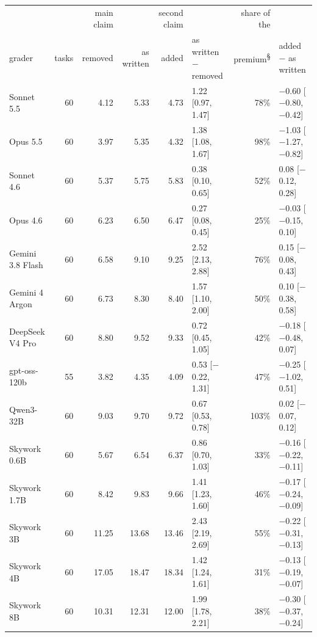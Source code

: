 {\scriptsize\setlength{\tabcolsep}{4pt}
\begin{tabular}{@{}lrrrr@{\hspace{8pt}}lr@{\hspace{8pt}}l@{}}
\toprule
 &  & main claim &  & second claim &  & share of the &  \\
grader & tasks & removed & as written & added & as written $-$ removed & premium\textsuperscript{\S} & added $-$ as written \\
\midrule
Sonnet 5.5 & 60 & 4.12 & 5.33 & 4.73 & 1.22 [0.97, 1.47] & 78\% & $-$0.60 [$-$0.80, $-$0.42] \\
Opus 5.5 & 60 & 3.97 & 5.35 & 4.32 & 1.38 [1.08, 1.67] & 98\% & $-$1.03 [$-$1.27, $-$0.82] \\
Sonnet 4.6 & 60 & 5.37 & 5.75 & 5.83 & 0.38 [0.10, 0.65] & 52\% & 0.08 [$-$0.12, 0.28] \\
Opus 4.6 & 60 & 6.23 & 6.50 & 6.47 & 0.27 [0.08, 0.45] & 25\% & $-$0.03 [$-$0.15, 0.10] \\
Gemini 3.8 Flash & 60 & 6.58 & 9.10 & 9.25 & 2.52 [2.13, 2.88] & 76\% & 0.15 [$-$0.08, 0.43] \\
Gemini 4 Argon & 60 & 6.73 & 8.30 & 8.40 & 1.57 [1.10, 2.00] & 50\% & 0.10 [$-$0.38, 0.58] \\
DeepSeek V4 Pro & 60 & 8.80 & 9.52 & 9.33 & 0.72 [0.45, 1.05] & 42\% & $-$0.18 [$-$0.48, 0.07] \\
gpt-oss-120b & 55 & 3.82 & 4.35 & 4.09 & 0.53 [$-$0.22, 1.31] & 47\% & $-$0.25 [$-$1.02, 0.51] \\
Qwen3-32B & 60 & 9.03 & 9.70 & 9.72 & 0.67 [0.53, 0.78] & 103\% & 0.02 [$-$0.07, 0.12] \\
\midrule
Skywork 0.6B & 60 & 5.67 & 6.54 & 6.37 & 0.86 [0.70, 1.03] & 33\% & $-$0.16 [$-$0.22, $-$0.11] \\
Skywork 1.7B & 60 & 8.42 & 9.83 & 9.66 & 1.41 [1.23, 1.60] & 46\% & $-$0.17 [$-$0.24, $-$0.09] \\
Skywork 3B & 60 & 11.25 & 13.68 & 13.46 & 2.43 [2.19, 2.69] & 55\% & $-$0.22 [$-$0.31, $-$0.13] \\
Skywork 4B & 60 & 17.05 & 18.47 & 18.34 & 1.42 [1.24, 1.61] & 31\% & $-$0.13 [$-$0.19, $-$0.07] \\
Skywork 8B & 60 & 10.31 & 12.31 & 12.00 & 1.99 [1.78, 2.21] & 38\% & $-$0.30 [$-$0.37, $-$0.24] \\
\bottomrule
\end{tabular}}
